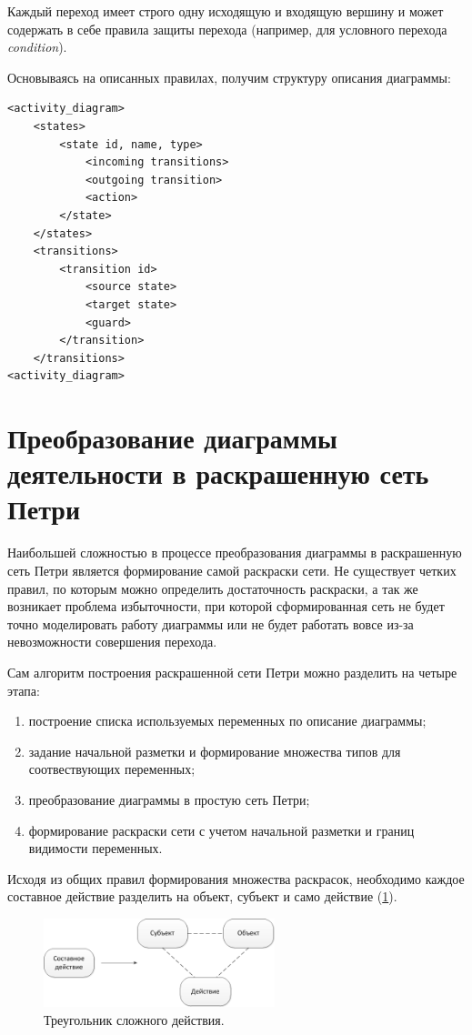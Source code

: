 Каждый переход имеет строго одну исходящую и входящую вершину и может содержать в себе правила защиты перехода (например, для условного перехода \textit{condition}).

Основываясь на описанных правилах, получим структуру описания диаграммы:

\begin{lstlisting}[style=grammar,basicstyle=\small,caption={Структура XMI файла}]
<activity_diagram>
	<states>
		<state id, name, type>
			<incoming transitions>
			<outgoing transition>
			<action>
		</state>
	</states>
	<transitions>
		<transition id>
			<source state>
			<target state>
			<guard>
		</transition>
	</transitions>
<activity_diagram>
\end{lstlisting}

\section{Преобразование диаграммы деятельности в раскрашенную сеть Петри}

Наибольшей сложностью в процессе преобразования диаграммы в раскрашенную сеть Петри является формирование самой раскраски сети. Не существует четких правил, по которым можно определить достаточность раскраски, а так же возникает проблема избыточности, при которой сформированная сеть не будет точно моделировать работу диаграммы или не будет работать вовсе из-за невозможности совершения перехода.

Сам алгоритм построения раскрашенной сети Петри можно разделить на четыре этапа:

\begin{enumerate}
\item[1.] построение списка используемых переменных по описание диаграммы;
\item[2.] задание начальной разметки и формирование множества типов для соотвествующих переменных;
\item[3.] преобразование диаграммы в простую сеть Петри;
\item[4.] формирование раскраски сети с учетом начальной разметки и границ видимости переменных.
\end{enumerate}

Исходя из общих правил формирования множества раскрасок, необходимо каждое составное действие разделить на объект, субъект и само действие (\ref{fig:fig4}).

\begin{figure}
	\begin{center}
		\includegraphics[width=0.6\textwidth]{include/CompositeActivity.png}
	\end{center}
	\caption{Треугольник сложного действия.}
	\label{fig:fig4}
\end{figure}

